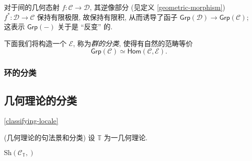 对于\topos{}间的几何态射 $f \colon \mathcal C \to \mathcal D$, 其逆像部分 (见定义 \ref{geometric-morphism}) $f^* \colon \mathcal D \to \mathcal C$ 保持有限极限, 故保持有限积, 从而诱导了函子 $\mathsf {Grp}(\mathcal D) \to \mathsf {Grp}(\mathcal C)$;
这表示 $\mathsf {Grp}(-)$ 关于\topos{}是 ``反变'' 的.

下面我们将构造一个\topos{} $\mathcal E$, 称为\emph{群的分类\topos{}}, 使得有自然的范畴等价
$$
\mathsf {Grp}(\mathcal C) \simeq \mathsf{Hom}(\mathcal C,\mathcal E).
$$

\subsubsection{环的分类\topos{}}



%
%
%

\subsection{几何理论的分类\topos{}}

\ref{classifying-locale}

\begin{definition}
    {(几何理论的句法景和分类\topos{})}
    设 $\mathbb T$ 为一几何理论.
    
    $\text{Sh}(\mathcal C_{\mathbb T},)$
\end{definition}

